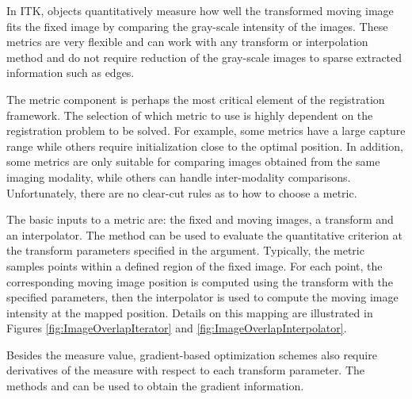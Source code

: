 %
%
%
%


In ITK,  objects quantitatively measure how well
the transformed moving image fits the fixed image by comparing the gray-scale
intensity of the images. These metrics are very flexible and can work with any
transform or interpolation method and do not require reduction of the
gray-scale images to sparse extracted information such as edges.

The metric component is perhaps the most critical element of the registration
framework. The selection of which metric to use is highly dependent on the
registration problem to be solved. For example, some metrics have a large
capture range while others require initialization close to the optimal
position.  In addition, some metrics are only suitable for comparing images obtained from the
same imaging modality, while others can handle inter-modality comparisons.
Unfortunately, there are no clear-cut rules as to how to choose a metric.


The basic inputs to a metric are: the fixed and moving images, a transform and
an interpolator. The method  can be used to evaluate the
quantitative criterion at the transform parameters specified in the argument.
Typically, the metric samples points within a defined region of the fixed
image.  For each point, the corresponding moving image position is computed
using the transform with the specified parameters, then the interpolator is
used to compute the moving image intensity at the mapped position. Details on
this mapping are illustrated in Figures \ref{fig:ImageOverlapIterator} and
\ref{fig:ImageOverlapInterpolator}. 

Besides the measure value, gradient-based optimization schemes also require
derivatives of the measure with respect to each transform parameter. The
methods  and  can be
used to obtain the gradient information.


